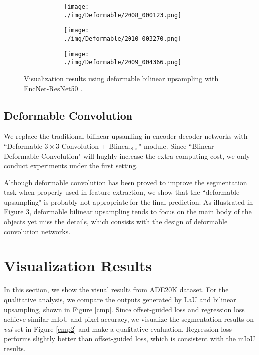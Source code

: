 \documentclass[10pt,twocolumn,letterpaper]{article}
\begin{document}
\begin{figure}[t]
\begin{subfigure}[t]{0.15\textwidth}
        \begin{subfigure}[t]{\textwidth}
                \texttt{[image: ./img/Deformable/2008\_000123.png]}
            \end{subfigure}\vspace{.1ex}

        \begin{subfigure}[t]{\textwidth}
                \texttt{[image: ./img/Deformable/2010\_003270.png]}
            \end{subfigure}\vspace{.1ex}

            \begin{subfigure}[t]{\textwidth}
                \texttt{[image: ./img/Deformable/2009\_004366.png]}
 \captionsetup{justification=centering}            
        \label{e}
            \end{subfigure}
    \end{subfigure}
\caption{Visualization results using deformable bilinear upsampling with EncNet-ResNet50 \cite{EncNet}.}
\label{deformable}
\end{figure}

\subsection{Deformable Convolution}
We replace the traditional bilinear upsamling in encoder-decoder networks with ``Deformable $3\times3$ Convolution \cite{DaiQXLZHW17} + Blinear$_{8\times}$" module. Since ``Blinear + Deformable  Convolution" will hughly increase the extra computing cost, we only conduct experiments under the first setting.

Although deformable convolution has been proved to improve the segmentation task when properly used in feature extraction, we show that the ``deformable upsampling" is probably not appropriate for the final prediction. As illustrated in Figure \ref{deformable}, deformable bilinear upsampling tends to focus on the main body of the objects yet miss the details, which consists with the design  of deformable convolution networks.

\section{Visualization Results}
In this section, we show the visual results from ADE20K dataset. For the qualitative analysis, we compare the outputs generated by LaU and bilinear upsampling, shown in Figure \ref{cmp}. Since offset-guided loss and regression loss achieve similar mIoU and pixel accuracy, we visualize the segmentation results on \textit{val} set in Figure \ref{cmp2} and make a qualitative evaluation. Regression loss performs slightly better than offset-guided loss, which is consistent with the mIoU results.
\end{document}
